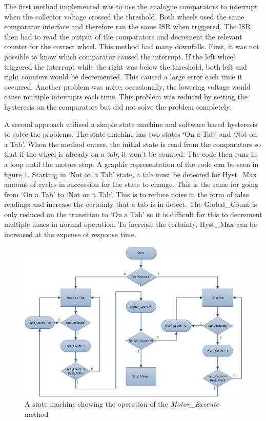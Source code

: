 The first method implemented was to use the analogue comparators to interrupt when the collector voltage crossed the threshold. Both wheels used the same comparator interface and therefore ran the same ISR when triggered. The ISR then had to read the output of the comparators and decrement the relevant counter for the correct wheel. This method had many downfalls. First, it was not possible to know which comparator caused the interrupt. If the left wheel triggered the interrupt while the right was below the threshold, both left and right counters would be decremented. This caused a large error each time it occurred. Another problem was noise; occasionally, the lowering voltage would cause multiple interrupts each time. This problem was reduced by setting the hysteresis on the comparators but did not solve the problem completely. 

A second approach utilised a simple state machine and software based hysteresis to solve the problems. The state machine has two states `On a Tab' and `Not on a Tab'. When the method enters, the initial state is read from the comparators so that if the wheel is already on a tab, it won't be counted. The code then runs in a loop until the motors stop. A graphic representation of the code can be seen in figure \ref{fig:StateMachine}. Starting in `Not on a Tab' state, a tab must be detected for Hyst\_Max amount of cycles in succession for the state to change. This is the same for going from `On a Tab' to `Not on a Tab'. This is to reduce noise in the form of false readings and increase the certainty that a tab is in detect. The Global\_Count is only reduced on the transition to `On a Tab' so it is difficult for this to decrement multiple times in normal operation. To increase the certainty, Hyst\_Max can be increased at the expense of response time. 


\begin{figure}
\includegraphics[width=\textwidth]{Figures/ASM.jpg}
\caption{A state machine showing the operation of the \textit{Motor\_Execute} method}
\label{fig:StateMachine}
\end{figure}


